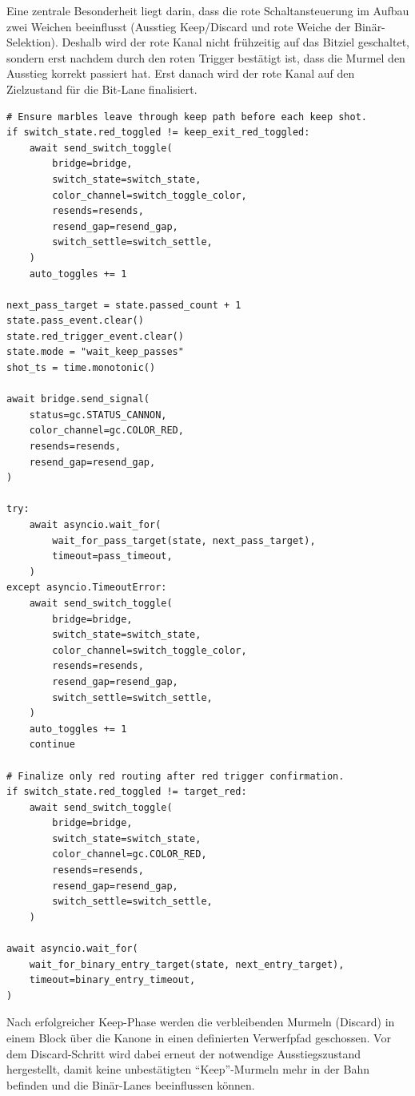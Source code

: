 Eine zentrale Besonderheit liegt darin, dass die rote Schaltansteuerung im Aufbau zwei Weichen beeinflusst (Ausstieg Keep/Discard und rote Weiche der Binär-Selektion). Deshalb wird der rote Kanal nicht frühzeitig auf das Bitziel geschaltet, sondern erst nachdem durch den roten Trigger bestätigt ist, dass die Murmel den Ausstieg korrekt passiert hat. Erst danach wird der rote Kanal auf den Zielzustand für die Bit-Lane finalisiert.

\begin{listing}[ht]
\caption{Auszug: Keep-Phase mit Auto-Toggle bei fehlender Rückmeldung und späterer Finalisierung des roten Kanals}
\label{lst:keep_phase}
\begin{verbatim}
# Ensure marbles leave through keep path before each keep shot.
if switch_state.red_toggled != keep_exit_red_toggled:
	await send_switch_toggle(
		bridge=bridge,
		switch_state=switch_state,
		color_channel=switch_toggle_color,
		resends=resends,
		resend_gap=resend_gap,
		switch_settle=switch_settle,
	)
	auto_toggles += 1

next_pass_target = state.passed_count + 1
state.pass_event.clear()
state.red_trigger_event.clear()
state.mode = "wait_keep_passes"
shot_ts = time.monotonic()

await bridge.send_signal(
	status=gc.STATUS_CANNON,
	color_channel=gc.COLOR_RED,
	resends=resends,
	resend_gap=resend_gap,
)

try:
	await asyncio.wait_for(
		wait_for_pass_target(state, next_pass_target),
		timeout=pass_timeout,
	)
except asyncio.TimeoutError:
	await send_switch_toggle(
		bridge=bridge,
		switch_state=switch_state,
		color_channel=switch_toggle_color,
		resends=resends,
		resend_gap=resend_gap,
		switch_settle=switch_settle,
	)
	auto_toggles += 1
	continue

# Finalize only red routing after red trigger confirmation.
if switch_state.red_toggled != target_red:
	await send_switch_toggle(
		bridge=bridge,
		switch_state=switch_state,
		color_channel=gc.COLOR_RED,
		resends=resends,
		resend_gap=resend_gap,
		switch_settle=switch_settle,
	)

await asyncio.wait_for(
	wait_for_binary_entry_target(state, next_entry_target),
	timeout=binary_entry_timeout,
)
\end{verbatim}
\end{listing}

Nach erfolgreicher Keep-Phase werden die verbleibenden Murmeln (Discard) in einem Block über die Kanone in einen definierten Verwerfpfad geschossen. Vor dem Discard-Schritt wird dabei erneut der notwendige Ausstiegszustand hergestellt, damit keine unbestätigten ``Keep''-Murmeln mehr in der Bahn befinden und die Binär-Lanes beeinflussen können.


